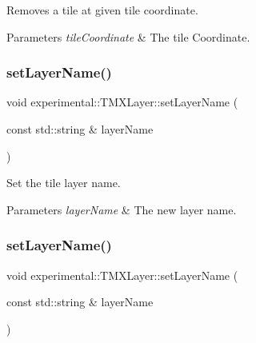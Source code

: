 Removes a tile at given tile coordinate.


\begin{DoxyParams}{Parameters}
{\em tile\+Coordinate} & The tile Coordinate. \\
\hline
\end{DoxyParams}
\mbox{\label{classexperimental_1_1TMXLayer_a4b2bc396c567d19dc300d582cfb0440d}} 
\subsubsection{\texorpdfstring{set\+Layer\+Name()}{setLayerName()}\hspace{0.1cm}{\footnotesize\ttfamily [1/2]}}
{\footnotesize\ttfamily void experimental\+::\+T\+M\+X\+Layer\+::set\+Layer\+Name (\begin{DoxyParamCaption}\item[{const std\+::string \&}]{layer\+Name }\end{DoxyParamCaption})\hspace{0.3cm}{\ttfamily [inline]}}

Set the tile layer name.


\begin{DoxyParams}{Parameters}
{\em layer\+Name} & The new layer name. \\
\hline
\end{DoxyParams}
\mbox{\label{classexperimental_1_1TMXLayer_a4b2bc396c567d19dc300d582cfb0440d}} 
\subsubsection{\texorpdfstring{set\+Layer\+Name()}{setLayerName()}\hspace{0.1cm}{\footnotesize\ttfamily [2/2]}}
{\footnotesize\ttfamily void experimental\+::\+T\+M\+X\+Layer\+::set\+Layer\+Name (\begin{DoxyParamCaption}\item[{const std\+::string \&}]{layer\+Name }\end{DoxyParamCaption})\hspace{0.3cm}{\ttfamily [inline]}}


